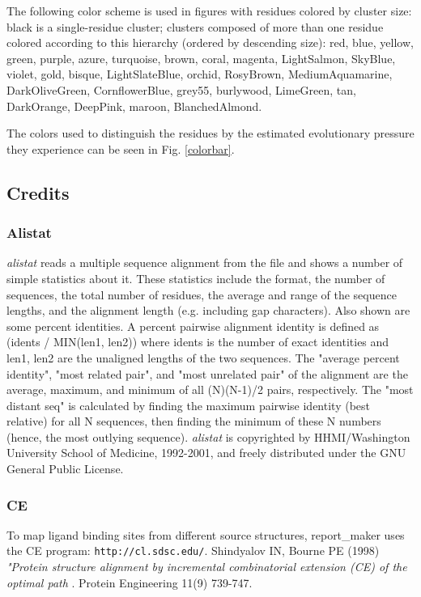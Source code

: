 The following color scheme is used in figures with residues colored by  cluster size:
 black is a single-residue cluster; clusters composed of more than one residue colored according to this hierarchy 
(ordered by descending size): red, blue, yellow, green, purple, azure, turquoise, brown, coral,
               magenta, LightSalmon, SkyBlue, violet, gold, bisque, LightSlateBlue, orchid,
               RosyBrown, MediumAquamarine, DarkOliveGreen, CornflowerBlue, grey55, burlywood,
               LimeGreen, tan, DarkOrange, DeepPink, maroon, BlanchedAlmond.

The colors used to distinguish the residues by the estimated  evolutionary pressure they experience can
be seen in Fig. \ref{colorbar}.


\subsection{Credits}
%
\subsubsection{\bf Alistat}
\emph{alistat} reads a multiple sequence alignment from the file  and shows a number of simple statistics about it. 
These statistics include the format, the number of sequences, 
the total number of residues, the average and range of the sequence lengths, and the alignment length (e.g. including gap characters).
Also shown are some percent identities. A percent pairwise alignment identity is defined as (idents / MIN(len1, len2)) 
where idents is the number of exact identities and len1, len2 are the unaligned lengths of the two sequences. 
The "average percent identity", "most related pair", and "most unrelated pair" of the alignment are the average,
 maximum, and minimum of all (N)(N-1)/2 pairs, respectively. 
The "most distant seq" is calculated by finding the maximum pairwise identity 
(best relative) for all N sequences, then finding the minimum of these N numbers (hence, the most outlying sequence). 
\emph{alistat} is copyrighted by  HHMI/Washington University School of Medicine, 1992-2001,
and freely distributed under the GNU General Public License.
%
%
\subsubsection{\bf CE}
To map ligand binding sites from different source structures, report\_maker uses the CE program:
{\tt http://cl.sdsc.edu/}.
Shindyalov IN, Bourne PE (1998) \emph {"Protein structure alignment by incremental combinatorial extension (CE) of the optimal path}
. Protein Engineering 11(9) 739-747.

